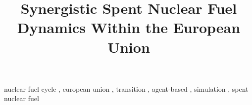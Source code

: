 \documentclass[review]{elsarticle}
\begin{document}
\begin{frontmatter}
\title{Synergistic Spent Nuclear Fuel Dynamics Within the European Union}

\date{}                     %





\begin{keyword}
nuclear fuel cycle \sep
european union \sep
transition \sep 
agent-based \sep 
simulation \sep 
spent nuclear fuel 
\end{keyword}


\end{frontmatter}
\glsresetall

\linenumbers



\FloatBarrier


\FloatBarrier





\pagebreak

\end{document}
